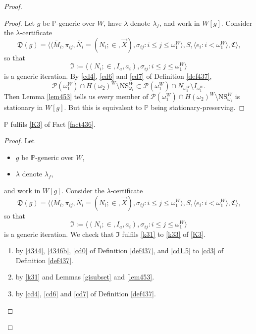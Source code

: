 \documentclass[12pt]{article}
\numberwithin{equation}{section}
\begin{document}
\begin{proof}
\begin{proof}
Let $g$ be $\mathbb{P}$-generic over $W$, have $\lambda$ denote $\lambda_f$, and work in $W[g]$. Consider the $\lambda$-certificate
\begin{equation*}
    \mathfrak{D}(g) = \langle \langle \bar{M}_i, \pi_{ij},  \bar{N}_i = (N_i; \in, \Vec{X}), \sigma_{ij} : i \leq j \leq \omega_1^{W} \rangle, S, \langle e_i : i < \omega_1^W \rangle, \mathfrak{C} \rangle \text{,}
\end{equation*}
so that 
\begin{equation*}
    \mathfrak{I} := \langle (N_i; \in, I_a, a_i), \sigma_{ij} : i \leq j \leq \omega_1^{W} \rangle
\end{equation*}
is a generic iteration. By \ref{cd4}, \ref{cd6} and \ref{cd7} of Definition \ref{def437}, 
\begin{equation*}
    \mathcal{P}(\omega_1^W) \cap H(\omega_2)^W \setminus \mathrm{NS}_{\omega_1}^W \subset \mathcal{P}(\omega_1^W) \cap N_{\omega_1^W} \setminus I_{\omega_1^W} \text{.}
\end{equation*}
Then Lemma \ref{lem453} tells us every member of $\mathcal{P}(\omega_1^W) \cap H(\omega_2)^W \setminus \mathrm{NS}_{\omega_1}^W$ is stationary in $W[g]$. But this is equivalent to $\mathbb{P}$ being stationary-preserving.
\end{proof}

\begin{lem}\label{lem455}
$\mathbb{P}$ fulfils \ref{K3} of Fact \ref{fact436}.
\end{lem}

\begin{proof}
Let 
\begin{itemize}
    \item $g$ be $\mathbb{P}$-generic over $W$,
    \item $\lambda$ denote $\lambda_f$, 
\end{itemize} 
and work in $W[g]$. Consider the $\lambda$-certificate
\begin{equation*}
    \mathfrak{D}(g) = \langle \langle \bar{M}_i, \pi_{ij},  \bar{N}_i = (N_i; \in, \Vec{X}), \sigma_{ij} : i \leq j \leq \omega_1^{W} \rangle, S, \langle e_i : i < \omega_1^W \rangle, \mathfrak{C} \rangle \text{,}
\end{equation*}
so that 
\begin{equation*}
    \mathfrak{I} := \langle (N_i; \in, I_a, a_i), \sigma_{ij} : i \leq j \leq \omega_1^{W} \rangle
\end{equation*}
is a generic iteration. We check that $\mathfrak{I}$ fulfils \ref{k31} to \ref{k33} of \ref{K3}.
\begin{enumerate}[label=That \ref{k3\arabic*} holds:, leftmargin=100pt]
    \item by \ref{4344}, \ref{4346b}, \ref{cd0} of Definition \ref{def437}, and \ref{cd1.5} to \ref{cd3} of Definition \ref{def437}.
    \item by \ref{k31} and Lemmas \ref{gisubset} and \ref{lem453}.
    \item by \ref{cd4}, \ref{cd6} and \ref{cd7} of Definition \ref{def437}. \qedhere
\end{enumerate}
\end{proof}


\end{proof}
\end{document}
